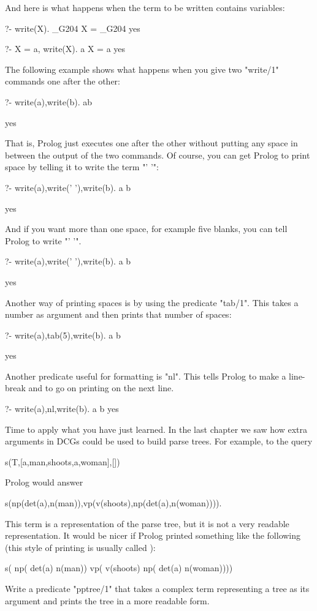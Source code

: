 And here is what happens when the term  to be written contains
variables:

\begin{LPNcodedisplay}
?- write(X).
_G204
X = _G204
yes

?- X = a, write(X).
a
X = a
yes
\end{LPNcodedisplay}


The following example shows what happens when you give two  "write/1"
commands one after the other:
\begin{LPNcodedisplay}
?- write(a),write(b).
ab

yes
\end{LPNcodedisplay}
That is, Prolog just executes one after the other without putting any
space in between the output of the two commands. Of
course, you can get Prolog to print space by telling it to write the
term "' '":
\begin{LPNcodedisplay}
?- write(a),write(' '),write(b).
a b

yes
\end{LPNcodedisplay}
And if you want more than one space, for example five blanks, you
can tell Prolog to write "'     '".
\begin{LPNcodedisplay}
?- write(a),write('     '),write(b).
a     b

yes
\end{LPNcodedisplay}

Another way of printing spaces is by using the predicate
"tab/1". This takes a number as argument and then
prints  that number of spaces:
\begin{LPNcodedisplay}
?- write(a),tab(5),write(b).
a     b

yes
\end{LPNcodedisplay}


Another predicate useful for formatting is "nl".
This  tells Prolog to make a line-break and to go on printing on
the next line.
\begin{LPNcodedisplay}
?- write(a),nl,write(b).
a
b
yes
\end{LPNcodedisplay}


Time to apply what you have just learned.
In the last chapter we saw how extra arguments in DCGs could be used
to build  parse trees. For example, to the query
\begin{LPNcodedisplay}
s(T,[a,man,shoots,a,woman],[])
\end{LPNcodedisplay}
Prolog would answer
\begin{LPNcodedisplay}
s(np(det(a),n(man)),vp(v(shoots),np(det(a),n(woman)))).
\end{LPNcodedisplay}
This term is a representation of the parse tree, but it is not a very readable
representation. It would be nicer if Prolog printed
something like the following (this style
of printing is usually called ):
\begin{LPNcodedisplay}
s(
  np(
     det(a)
     n(man))
  vp(
    v(shoots)
    np(
      det(a)
      n(woman))))
\end{LPNcodedisplay}
Write a predicate "pptree/1" that takes a complex term
representing a tree
as its argument and prints
the tree in a more readable form.

